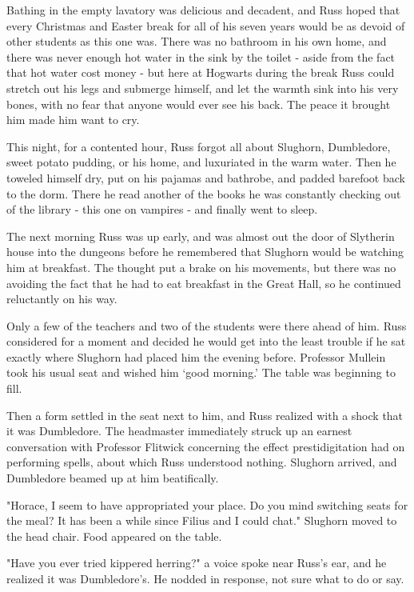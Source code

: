 \documentclass[a4paper,11pt]{article}
\begin{document}
Bathing in the empty lavatory was delicious and decadent, and Russ hoped that every Christmas and Easter break for all of his seven years would be as devoid of other students as this one was. There was no bathroom in his own home, and there was never enough hot water in the sink by the toilet - aside from the fact that hot water cost money - but here at Hogwarts during the break Russ could stretch out his legs and submerge himself, and let the warmth sink into his very bones, with no fear that anyone would ever see his back. The peace it brought him made him want to cry.

This night, for a contented hour, Russ forgot all about Slughorn, Dumbledore, sweet potato pudding, or his home, and luxuriated in the warm water. Then he toweled himself dry, put on his pajamas and bathrobe, and padded barefoot back to the dorm. There he read another of the books he was constantly checking out of the library - this one on vampires - and finally went to sleep.

The next morning Russ was up early, and was almost out the door of Slytherin house into the dungeons before he remembered that Slughorn would be watching him at breakfast. The thought put a brake on his movements, but there was no avoiding the fact that he had to eat breakfast in the Great Hall, so he continued reluctantly on his way.

Only a few of the teachers and two of the students were there ahead of him. Russ considered for a moment and decided he would get into the least trouble if he sat exactly where Slughorn had placed him the evening before. Professor Mullein took his usual seat and wished him `good morning.' The table was beginning to fill.

Then a form settled in the seat next to him, and Russ realized with a shock that it was Dumbledore. The headmaster immediately struck up an earnest conversation with Professor Flitwick concerning the effect prestidigitation had on performing spells, about which Russ understood nothing. Slughorn arrived, and Dumbledore beamed up at him beatifically.

"Horace, I seem to have appropriated your place. Do you mind switching seats for the meal? It has been a while since Filius and I could chat." Slughorn moved to the head chair. Food appeared on the table.

"Have you ever tried kippered herring?" a voice spoke near Russ's ear, and he realized it was Dumbledore's. He nodded in response, not sure what to do or say.
\end{document}

